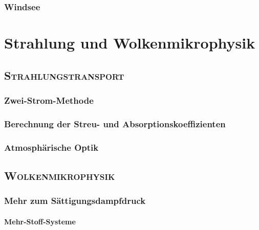 \documentclass{book}
\begin{document}
\section{Windsee}
\label{sec:windsee}

\part{Strahlung und Wolkenmikrophysik}
\label{part:strahlung_und_wolkenmikrophysik}

\chapter{\normalfont\textsc{Strahlungstransport}}
\label{chap:strahlungstransport}

\section{Zwei-Strom-Methode}
\label{sec:zwei-strom-methode}

\section{Berechnung der Streu- und Absorptionskoeffizienten}
\label{sec:berechnung_der_streu-_und_absorptionskoeffizienten}

\section{Atmosphärische Optik}
\label{sec:atmosphaerische_optik}

\chapter{\normalfont\textsc{Wolkenmikrophysik}}
\label{chap:wolkenmikrophysik}

\section{Mehr zum Sättigungsdampfdruck}
\label{sec:mehr_zum_sättigungsdampfdruck}

\subsection{Mehr-Stoff-Systeme}
\label{sec:mehr-stoff-systeme}
\end{document}

